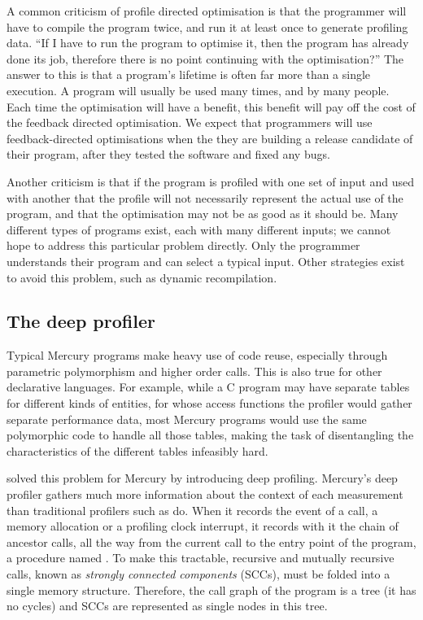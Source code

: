 

A common criticism of profile directed optimisation is that the programmer will
have to compile the program twice,
and run it at least once to generate profiling data.
``If I have to run the program to optimise it, then the program has
already done its job,
therefore there is no point continuing with the optimisation?''
The answer to this is that a program's lifetime is often far more than a
single execution.
A program will usually be used many times, and by many people.
Each time the optimisation will have a benefit,
this benefit will pay off the cost of the feedback directed optimisation.
We expect that programmers will use feedback-directed optimisations when the
they are building a release candidate of their program,
after they tested the software and fixed any bugs.

Another criticism is that if the program is profiled with one set of input and
used with another that the profile will not necessarily represent the actual use
of the program,
and that the optimisation may not be as good as it should be.
Many different types of programs exist, each with many different inputs;
we cannot hope to address this particular problem directly.
Only the programmer understands their program and can select a typical
input.
Other strategies exist to avoid this problem,
such as dynamic recompilation.

\subsection{The deep profiler}
\label{sec:backgnd_deep}

Typical Mercury programs make heavy use of code reuse,
especially through parametric polymorphism and higher order calls.
This is also true for other declarative languages.
For example, while a C program may have
separate tables for different kinds of entities,
for whose access functions
the profiler would gather separate performance data,
most Mercury programs would use
the same polymorphic code to handle all those tables,
making the task of disentangling the characteristics of the different tables
infeasibly hard.

\citep{conway:2001:mercury-deep}
solved this problem for Mercury by introducing deep profiling.
Mercury's deep profiler gathers much more information about the context of
each measurement than traditional profilers such as  \citep{gprof} do.
When it records the event of a call,
a memory allocation or a profiling clock interrupt,
it records with it the chain of ancestor calls,
all the way from the current call to the entry point of the program,
a procedure named .
To make this tractable,
recursive and mutually recursive calls,
known as \emph{strongly connected components} (SCCs),
must be folded into a single memory structure.
Therefore, the call graph of the program is a tree (it has no cycles)
and SCCs are represented as single nodes in this tree.

